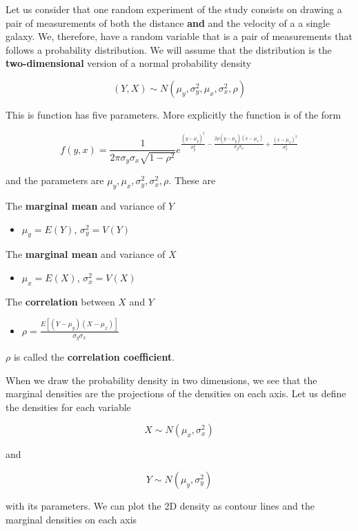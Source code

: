 \documentclass[
]{book}
\providecommand{\tightlist}{%
  \setlength{\itemsep}{0pt}\setlength{\parskip}{0pt}}
\begin{document}
Let us consider that one random experiment of the study consists on drawing a pair of measurements of both the distance \textbf{and} and the velocity of a a single galaxy. We, therefore, have a random variable that is a pair of measurements that follows a probability distribution. We will assume that the distribution is the \textbf{two-dimensional} version of a normal probability density

\[(Y, X) \sim N(\mu_y, \sigma^2_y, \mu_x, \sigma^2_x, \rho)\]

This is function has five parameters. More explicitly the function is of the form

\[f(y,x)=\frac{1}{2\pi \sigma_y\sigma_x \sqrt{1-\rho^2}}e^{\frac{(y-\mu_y)^2}{\sigma_y^2}-\frac{2\rho(y-\mu_y)(x-\mu_x)}{\sigma_y\sigma_x}+\frac{(x-\mu_x)^2}{\sigma_x^2}}\]

and the parameters are \(\mu_y, \mu_x, \sigma^2_y, \sigma_x^2, \rho\). These are

The \textbf{marginal mean} and variance of \(Y\)

\begin{itemize}
\tightlist
\item
  \(\mu_y=E(Y)\), \(\sigma^2_y=V(Y)\)
\end{itemize}

The \textbf{marginal mean} and variance of \(X\)

\begin{itemize}
\tightlist
\item
  \(\mu_x=E(X)\), \(\sigma^2_x=V(X)\)
\end{itemize}

The \textbf{correlation} between \(X\) and \(Y\)

\begin{itemize}
\tightlist
\item
  \(\rho=\frac{E[(Y-\mu_y)(X-\mu_x)]}{\sigma_y\sigma_x}\)
\end{itemize}

\(\rho\) is called the \textbf{correlation coefficient}.

When we draw the probability density in two dimensions, we see that the marginal densities are the projections of the densities on each axis. Let us define the densities for each variable

\[X \sim N(\mu_x, \sigma_x^2)\]

and

\[Y \sim N(\mu_y, \sigma_y^2)\]

with its parameters. We can plot the 2D density as contour lines and the marginal densities on each axis
\end{document}
